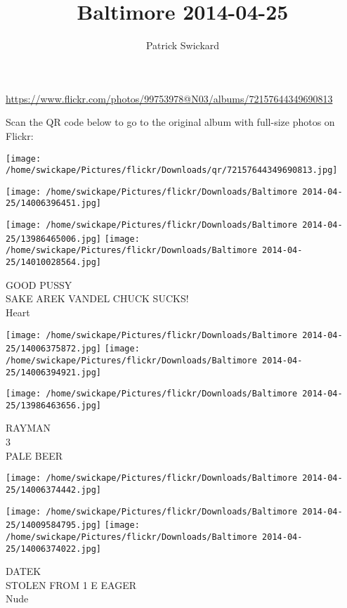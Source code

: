 \documentclass[10pt,letterpaper]{article}
\title{Baltimore 2014-04-25}
\author{Patrick Swickard}
\date{}
\begin{document}
\maketitle

\url{https://www.flickr.com/photos/99753978@N03/albums/72157644349690813}

Scan the QR code below to go to the original album with full-size photos on Flickr:

\texttt{[image: /home/swickape/Pictures/flickr/Downloads/qr/72157644349690813.jpg]}
\pagebreak

\texttt{[image: /home/swickape/Pictures/flickr/Downloads/Baltimore 2014-04-25/14006396451.jpg]}

\vspace{0.25in}
\texttt{[image: /home/swickape/Pictures/flickr/Downloads/Baltimore 2014-04-25/13986465006.jpg]}
\texttt{[image: /home/swickape/Pictures/flickr/Downloads/Baltimore 2014-04-25/14010028564.jpg]}

GOOD PUSSY\\
SAKE AREK VANDEL CHUCK SUCKS!\\
Heart
\pagebreak

\texttt{[image: /home/swickape/Pictures/flickr/Downloads/Baltimore 2014-04-25/14006375872.jpg]}
\texttt{[image: /home/swickape/Pictures/flickr/Downloads/Baltimore 2014-04-25/14006394921.jpg]}

\vspace{0.25in}
\texttt{[image: /home/swickape/Pictures/flickr/Downloads/Baltimore 2014-04-25/13986463656.jpg]}

RAYMAN\\
3\\
PALE BEER
\pagebreak

\texttt{[image: /home/swickape/Pictures/flickr/Downloads/Baltimore 2014-04-25/14006374442.jpg]}

\vspace{0.25in}
\texttt{[image: /home/swickape/Pictures/flickr/Downloads/Baltimore 2014-04-25/14009584795.jpg]}
\texttt{[image: /home/swickape/Pictures/flickr/Downloads/Baltimore 2014-04-25/14006374022.jpg]}

DATEK\\
STOLEN FROM 1 E EAGER\\
Nude
\pagebreak
\end{document}
